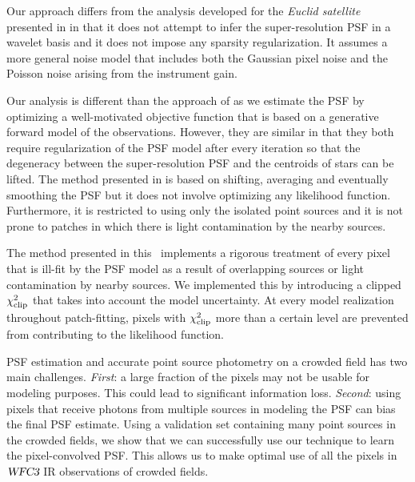Our approach differs from the analysis developed for the \emph{Euclid satellite} presented in \citet{ngole,ngole2} in that it does not attempt to infer the super-resolution PSF in a wavelet basis and it does not impose any sparsity regularization. It assumes a more general noise model that includes both the Gaussian pixel noise and the Poisson noise arising from the instrument gain.

Our analysis is different than the approach of \citet{anderson2000} as we estimate the PSF by optimizing a well-motivated objective function 
that is based on a generative forward model of the observations. However, they are similar in that they both require regularization of the PSF model after every iteration so that the degeneracy between the super-resolution PSF and the centroids of stars can be lifted. 
The method presented in \citet{anderson2000} is based on shifting, averaging and eventually smoothing the PSF but it does not involve optimizing any likelihood function.
Furthermore, it is restricted to using only the isolated point sources and it is not prone to patches in which there is light contamination by the nearby sources. 

The method presented in this \paper\ implements a rigorous treatment of every pixel that is ill-fit by the PSF model as a result of overlapping sources or light contamination by nearby sources. We implemented this by introducing a clipped $\chi^{2}_{\rm clip}$ that takes into account the model uncertainty. At every model realization throughout patch-fitting, pixels with $\chi^{2}_{\rm clip}$ more than a certain level are prevented from contributing to the likelihood function.

PSF estimation and accurate point source photometry on a crowded field has two main challenges. \emph{First}: a large fraction of the pixels may not be usable for modeling purposes. This could lead to  significant information loss. \emph{Second}: using pixels that receive photons from multiple sources in modeling the PSF can bias the final PSF estimate. 
Using a validation set containing many point sources in the crowded fields, we show that we can successfully use our technique to learn the pixel-convolved PSF. 
This allows us to make optimal use of all the pixels in ${\textsl{WFC3}}$ IR observations of crowded fields.



